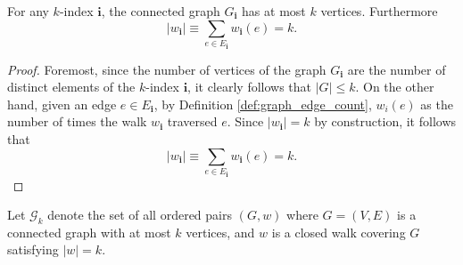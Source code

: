 \begin{lemma}
  \label{lem:graph_walk_le_k}
  For any $k$-index $\mathbf{i}$, the connected graph $G_\mathbf{i}$ has at most $k$ vertices. Furthermore
  \[
  |w_\mathbf{i}| \equiv \sum_{e \in E_\mathbf{i}} w_\mathbf{i}(e) = k.
  \]
\end{lemma}
\begin{proof}
  Foremost, since the number of vertices of the graph $G_\mathbf{i}$ 
  are the number of distinct elements of the $k$-index $\mathbf{i}$, it clearly follows that $|G| \leq k$.
  On the other hand, given an edge $e \in E_\mathbf{i}$, by Definition \ref{def:graph_edge_count}, $w_i(e)$ as the number of times the walk $w_\mathbf{i}$ traversed $e$. 
  Since $|w_\mathbf{i}| = k$ by construction, it follows that
  \[
  |w_\mathbf{i}| \equiv \sum_{e \in E_\mathbf{i}} w_\mathbf{i}(e) = k.
  \]
\end{proof}
\begin{definition}
  \label{def:g_k}
  Let $\mathcal{G}_k$ denote the set of all ordered pairs $(G,w)$ where $G = (V,E)$ is a connected graph with at most $k$ vertices, and
  $w$ is a closed walk covering $G$ satisfying $|w| = k$.
\end{definition}
